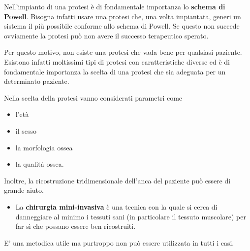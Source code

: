 \documentclass[]{article}
\begin{document}
Nell'impianto di una protesi è di fondamentale importanza lo
\textbf{schema di Powell}. Bisogna infatti usare una protesi che, una
volta impiantata, generi un sistema il più possibile conforme allo
schema di Powell. Se questo non succede ovviamente la protesi può non
avere il successo terapeutico sperato.

Per questo motivo, non esiste una protesi che vada bene per qualsiasi
paziente. Esistono infatti moltissimi tipi di protesi con
caratteristiche diverse ed è di fondamentale importanza la scelta di una
protesi che sia adeguata per un determinato paziente.

Nella scelta della protesi vanno considerati parametri come

\begin{itemize}
\item
  l'età
\item
  il sesso
\item
  la morfologia ossea
\item
  la qualità ossea.
\end{itemize}

Inoltre, la ricostruzione tridimensionale dell'anca del paziente può
essere di grande aiuto.

\begin{itemize}
\item
  La \textbf{chirurgia mini-invasiva} è una tecnica con la quale si
  cerca di danneggiare al minimo i tessuti sani (in particolare il
  tessuto muscolare) per far sì che possano essere ben ricostruiti.
\end{itemize}

E' una metodica utile ma purtroppo non può essere utilizzata in tutti i
casi.
\end{document}
